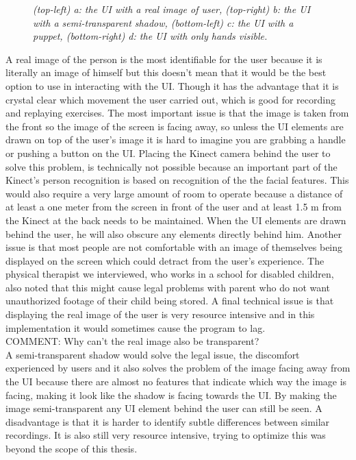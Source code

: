 \begin{figure}[H]
\begin{center}
 		\caption{\emph{(top-left) a: the UI with a real image of user, (top-right) b: the UI with a semi-transparent shadow, (bottom-left) c: the UI with a puppet, (bottom-right) d: the UI with only hands visible. }}
 		\label{user visualizations}
 	\end{center}
 \end{figure}
 
 
A real image of the person is the most identifiable for the user because it is literally an image of himself but this doesn't mean that it would be the best option to use in interacting with the UI. Though it has the advantage that it is crystal clear which movement the user carried out, which is good for recording and replaying exercises. The most important issue is that the image is taken from the front so the image of the screen is facing away, so unless the UI elements are drawn on top of the user's image it is hard to imagine you are grabbing a handle or pushing a button on the UI. Placing the Kinect camera behind the user to solve this problem, is technically not possible because an important part of the Kinect's person recognition is based on recognition of the the facial features. This would also require a very large amount of room to operate because a distance of at least a one meter from the screen in front of the user and at least 1.5 m from the Kinect at the back needs to be maintained. When the UI elements are drawn behind the user, he will also obscure any elements directly behind him. Another issue is that most people are not comfortable with an image of themselves being displayed on the screen which could detract from the user's experience. The physical therapist we interviewed, who works in a school for disabled children, also noted that this might cause legal problems with parent who do not want unauthorized footage of their child being stored. A final technical issue is that displaying the real image of the user is very resource intensive and in this implementation it would sometimes cause the program to lag.\\
 {\large COMMENT: Why can't the real image also be transparent?}\\
 
A semi-transparent shadow would solve the legal issue, the discomfort experienced by users and it also solves the problem of the image facing away from the UI because there are almost no features that indicate which way the image is facing, making it look like the shadow is facing towards the UI. By making the image semi-transparent any UI element behind the user can still be seen. A disadvantage is that it is harder to identify subtle differences between similar recordings. It is also still very resource intensive, trying to optimize this was beyond the scope of this thesis.\\
 
